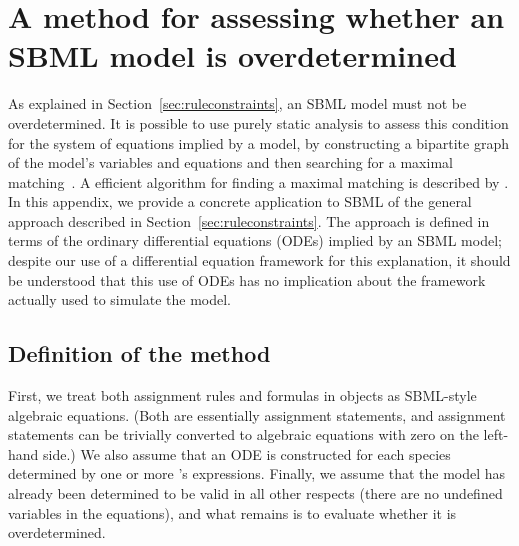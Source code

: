 
\section{A method for assessing whether an SBML model is overdetermined}
\label{apdx:assessing-overdetermined}

As explained in Section~\ref{sec:ruleconstraints}, an SBML model
must not be overdetermined.  It is possible to use purely static
analysis to assess this condition for the system of equations implied by a
model, by constructing a bipartite graph of the model's variables
and equations and then searching for a maximal
matching~\citep{chartrand_1977}.  A efficient algorithm for finding
a maximal matching is described by \cite{hopcroft:1973}.  In this
appendix, we provide a concrete application to SBML of the general
approach described in Section~\ref{sec:ruleconstraints}.  The
approach is defined in terms of the ordinary differential
equations (ODEs) implied by an SBML model; 
despite our use of a differential equation framework for
  this explanation, it should be understood that this
use of ODEs has no implication about the framework
  actually used to simulate the model.


\subsection*{Definition of the method}
\label{sec:overdetermined-method}

First, we treat both assignment rules and formulas in \KineticLaw
objects as SBML-style algebraic equations.  (Both are essentially
assignment statements, and assignment statements can be trivially
converted to algebraic equations with zero on the left-hand side.)
We also assume that an ODE is constructed for each species
determined by one or more \Reaction's \KineticLaw {}
expressions.  Finally, we assume that the model has already been
determined to be valid in all other respects (\eg there are no
undefined variables in the equations), and what remains is to
evaluate whether it is overdetermined.

